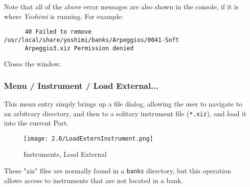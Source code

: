    Note that all of the above error messages are also shown in the console, if
   it is where \textsl{Yoshimi} is running.  For example:

   \begin{verbatim}
      40 Failed to remove /usr/local/share/yoshimi/banks/Arpeggios/0041-Soft
      Arpeggio3.xiz Permission denied
   \end{verbatim}



   Closes the window.

%
%

\subsubsection{Menu / Instrument / Load External...}
\label{subsubsec:menu_instrument_load}

   This menu entry simply brings up a file dialog, allowing the user to
   navigate to an arbitrary directory, and then to a solitary instrument file
   (\texttt{*.xiz}), and load it into the current Part.

\begin{figure}[H]
   \centering
   \texttt{[image: 2.0/LoadExternInstrument.png]}
   \caption{Instruments, Load External}
   \label{fig:instruments_load_external}
\end{figure}

   These "xiz" files are normally found in a \texttt{banks} directory, but
   this operation allows access to instruments that are not located in a bank.

